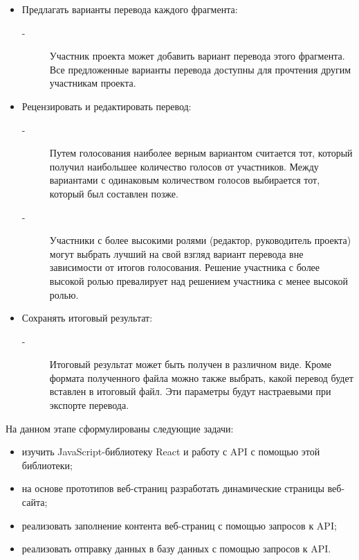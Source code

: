\documentclass[a4paper,12pt]{article}
\begin{document}
\begin{itemize}
\begin{description}
	\end{description}
	\item Предлагать варианты перевода каждого фрагмента:
	\begin{description}
		\item[-] Участник проекта может добавить вариант перевода этого фрагмента. Все предложенные варианты перевода доступны для прочтения другим участникам проекта.
	\end{description}
	\item Рецензировать и редактировать перевод:
	\begin{description}
		\item[-] Путем голосования наиболее верным вариантом считается тот, который получил наибольшее количество голосов от участников. Между вариантами с одинаковым количеством голосов выбирается тот, который был составлен позже.
		\item[-] Участники с более высокими ролями (редактор, руководитель проекта) могут выбрать лучший на свой взгляд вариант перевода вне зависимости от итогов голосования. Решение участника с более высокой ролью превалирует над решением участника с менее высокой ролью.
	\end{description}
	\item Сохранять итоговый результат:
	\begin{description}
		\item[-] Итоговый результат может быть получен в различном виде. Кроме формата полученного файла можно также выбрать, какой перевод будет вставлен в итоговый файл. Эти параметры будут настраевыми при экспорте перевода.
	\end{description}
\end{itemize}

На данном этапе сформулированы следующие задачи:
\begin{itemize}
	\item изучить JavaScript-библиотеку React и работу с API с помощью этой библиотеки;
	\item на основе прототипов веб-страниц разработать динамические страницы веб-сайта;
	\item реализовать заполнение контента веб-страниц с помощью запросов к API;
	\item реализовать отправку данных в базу данных с помощью запросов к API.
\end{itemize}



\end{document}
